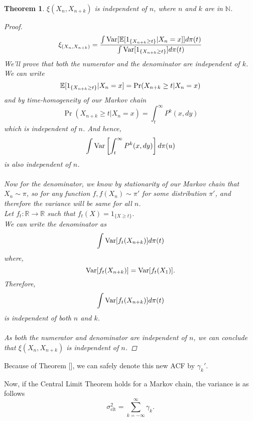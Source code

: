 \documentclass{article}
\newtheorem{theorem}{Theorem}[section]
\begin{document}
	\begin{theorem}
		$\xi(X_n, X_{n+k})$ is independent of $n$, where $n$ and $k$ are in $\mathbb{N}$.
		\begin{proof}
			\begin{equation}
				\xi_{(X_n, X_{n+k})} = \frac{\int \text{Var}[\mathbb{E}[1_{\{X_{n+k} \geq t\}}|X_n=x]] d\pi(t)}{\int \text{Var}[1_{\{X_{n+k} \geq t\}}] d\pi(t)}
			\end{equation}
			We'll prove that both the numerator and the denominator are independent of $k$. \\
			We can write
			\begin{equation*}
				\mathbb{E}[1_{\{X_{n+k} \geq t\}}|X_n=x] = \Pr(X_{n+k} \geq t|X_n=x) \\
			\end{equation*}
			and by time-homogeneity of our Markov chain
			\begin{equation*}
				\Pr(X_{n+k} \geq t|X_n=x) = \int_t^{\infty} P^k(x, dy)
			\end{equation*}
			which is independent of $n$. And hence,
			\begin{equation}
				\int \text{Var}\left[ \int_t^{\infty} P^k(x, dy)\right] d\pi(u)
			\end{equation}
			is also independent of $n$.\\\\
			Now for the denominator, we know by stationarity of our Markov chain that $X_n \sim \pi$, so for any function $f, f(X_n) \sim \pi'$ for some distribution $\pi'$, and therefore the variance will be same for all $n$.\\
			Let $f_t: \mathbb{R} \rightarrow \mathbb{R}$ such that $f_t(X) = 1_{\{X \geq t\}}$.\\
			We can write the denominator as
			$$\int \text{Var}[f_t(X _{n+k})] d\pi(t)$$
			where,
			$$\text{Var}[f_t(X_{n+k})] = \text{Var}[f_t(X_{1})].$$
			Therefore,
			$$\int \text{Var}[f_t(X_{n+k})] d\pi(t)$$
			is independent of both $n$ and $k$.\\\\
			As both the numerator and denominator are independent of $n$, we can conclude that $\xi(X_n, X_{n+k})$ is independent of $n$.
		\end{proof}
	\end{theorem}
	Because of Theorem [], we can safely denote this new ACF by $\gamma_k'$.

	Now, if the Central Limit Theorem holds for a Markov chain, the variance is as follows
	$$\sigma_{\text{clt}}^2 = \sum_{k=-\infty}^{\infty} \gamma_k.$$
\end{document}

